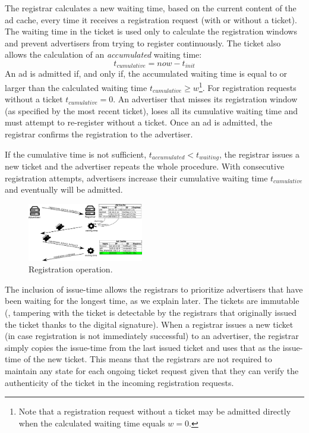 The registrar calculates a new waiting time, based on the current content of
the ad cache, every time it receives a registration request (with or without
a ticket). The waiting time in the ticket is used only to calculate the
registration windows and prevent advertisers from trying to register
continuously. The ticket also allows the calculation of an \emph{accumulated} waiting time:
\begin{equation}
    t_\textit{cumulative} = \textit{now} - t_\textit{init}
\end{equation}
An ad is admitted if, and only if, the accumulated waiting time is equal to or larger than the calculated waiting time $t_\textit{cumulative} \ge w$\footnote{Note that a registration request without a ticket may be admitted directly when the calculated waiting time equals $w=0$.}. 
For registration requests without a ticket $t_\textit{cumulative} = 0$. An advertiser that misses its registration window (as specified by the most recent ticket), loses all its cumulative waiting time and must attempt to re-register without a ticket. Once an ad is admitted, the registrar confirms the registration to the advertiser.

If the cumulative time is not sufficient, $t_\textit{accumulated} < t_\textit{waiting}$, the registrar issues a new ticket and the advertiser repeats the whole procedure.
With consecutive registration attempts, advertisers increase their cumulative waiting time $t_\textit{cumulative}$ and eventually will be admitted. 


\begin{figure}
    \includegraphics[width=0.45\textwidth]{img/registration}
    \vspace{-0.15in}
    \caption{Registration operation.}
    \label{fig:registration}
    \vspace{-0.15in}
\end{figure}

The inclusion of issue-time allows the registrars to prioritize advertisers that have been waiting for the longest time, as we explain later. The tickets are immutable (\ie, tampering with the ticket is detectable by the registrars that originally issued the ticket thanks to the digital signature). When a registrar issues a new ticket (in case registration is not immediately successful) to an advertiser, the registrar simply copies the issue-time from the last issued ticket and uses that as the issue-time of the new ticket. This means that the registrars are not required to maintain any state for each ongoing ticket request given that they can verify the authenticity of the ticket in the incoming registration requests.



